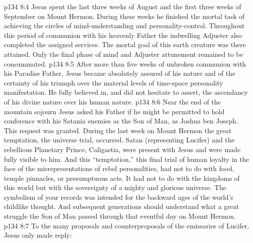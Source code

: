 \vs p134 8:4 Jesus spent the last three weeks of August and the first three weeks of September on Mount Hermon. During these weeks he finished the mortal task of achieving the circles of mind\hyp{}understanding and personality\hyp{}control. Throughout this period of communion with his heavenly Father the indwelling Adjuster also completed the assigned services. The mortal goal of this earth creature was there attained. Only the final phase of mind and Adjuster attunement remained to be consummated.
\vs p134 8:5 After more than five weeks of unbroken communion with his Paradise Father, Jesus became absolutely assured of his nature and of the certainty of his triumph over the material levels of time\hyp{}space personality manifestation. He fully believed in, and did not hesitate to assert, the ascendancy of his divine nature over his human nature.
\vs p134 8:6 \pc Near the end of the mountain sojourn Jesus asked his Father if he might be permitted to hold conference with his Satania enemies as the Son of Man, as Joshua ben Joseph. This request was granted. During the last week on Mount Hermon the great temptation, the universe trial, occurred. Satan (representing Lucifer) and the rebellious Planetary Prince, Caligastia, were present with Jesus and were made fully visible to him. And this “temptation,” this final trial of human loyalty in the face of the misrepresentations of rebel personalities, had not to do with food, temple pinnacles, or presumptuous acts. It had not to do with the kingdoms of this world but with the sovereignty of a mighty and glorious universe. The symbolism of your records was intended for the backward ages of the world’s childlike thought. And subsequent generations should understand what a great struggle the Son of Man passed through that eventful day on Mount Hermon.
\vs p134 8:7 To the many proposals and counterproposals of the emissaries of Lucifer, Jesus only made reply: 
